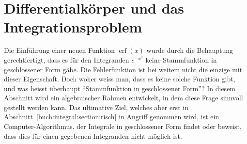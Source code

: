 %
%
%
\section{Differentialkörper und das Integrationsproblem
\label{buch:integrale:section:dkoerper}}
Die Einführung einer neuen Funktion $\operatorname{erf}(x)$ wurde
durch die Behauptung gerechtfertigt, dass es für den Integranden
$e^{-x^2}$ keine Stammfunktion in geschlossener Form gäbe.
Die Fehlerfunktion ist bei weitem nicht die einzige mit dieser
Eigenschaft.
Doch woher weiss man, dass es keine solche Funktion gibt, und
was heisst überhaupt ``Stammfunktion in geschlossener Form''?
In diesem Abschnitt wird ein algebraischer Rahmen entwickelt,
in dem diese Frage sinnvoll gestellt werden kann.
Das ultimative Ziel, welches aber erst in
Abschnitt~\ref{buch:integral:section:risch} in Angriff genommen
wird, ist ein Computer-Algorithmus, der Integrale in geschlossener
Form findet oder beweist, dass dies für einen gegebenen Integranden
nicht möglich ist.







